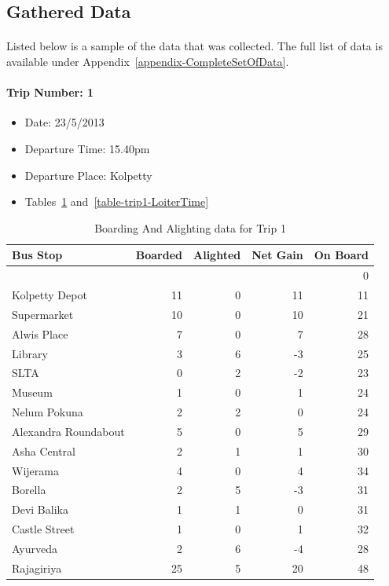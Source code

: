 \subsection {Gathered Data}
\label {GatheredData}

\paragraph{ } Listed below is a sample of the data that was collected. The full list of data is available under Appendix~\ref{appendix-CompleteSetOfData}.

\paragraph{Trip Number: 1}
\begin{itemize}
\item Date: 23/5/2013
\item Departure Time: 15.40pm
\item Departure Place: Kolpetty
\item Tables~\ref{table-trip1-BoardingAndAlighting} and~\ref{table-trip1-LoiterTime}
\end{itemize}

\begin{table}[H]
\centering
\begin{tabular}{|l|r|r|r|r|}
\hline
Bus Stop & Boarded & Alighted & Net Gain & On Board \\
\hline
 & & & & 0 \\
Kolpetty Depot	&11	&0	&11	&11\\
Supermarket	&10	&0	&10	&21\\
Alwis Place	&7	&0	&7	&28\\
Library	&3	&6	&-3	&25\\
SLTA	&0	&2	&-2	&23\\
\rowcolor[gray]{0.7}
Museum	&1	&0	&1	&24\\
Nelum Pokuna	&2	&2	&0	&24\\
\rowcolor[gray]{0.7}
Alexandra Roundabout	&5	&0	&5	&29\\
Asha Central	&2	&1	&1	&30\\
Wijerama	&4	&0	&4	&34\\
Borella	&2	&5	&-3	&31\\
Devi Balika	&1	&1	&0	&31\\
Castle Street	&1	&0	&1	&32\\
Ayurveda	&2	&6	&-4	&28\\
Rajagiriya	&25	&5	&20	&48\\
\hline
\end{tabular}
\caption{Boarding And Alighting data for Trip 1}
\label{table-trip1-BoardingAndAlighting}
\end{table}

